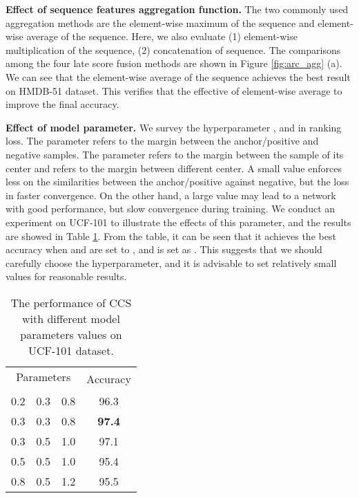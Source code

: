 \documentclass[conference,compsoc]{IEEEtran}
\begin{document}
\noindent\textbf{Effect of sequence features aggregation function.} The two commonly used aggregation methods are the element-wise maximum of the sequence and element-wise average of the sequence. Here, we also evaluate (1) element-wise multiplication of the sequence, (2) concatenation of sequence. The comparisons among the four late score fusion methods are shown in Figure \ref{fig:arc_agg} (a). We can see that the element-wise average of the sequence achieves the best result on HMDB-51 dataset. This verifies that the effective of element-wise average to improve the final accuracy.

\noindent\textbf{Effect of model parameter.} We survey the hyperparameter ,  and  in ranking loss. The parameter  refers to the margin between the anchor/positive and negative samples. The parameter  refers to the margin between the sample of its center and  refers to the margin between different center. A small value enforces less on the similarities between the anchor/positive against negative, but the loss in faster convergence. On the other hand, a large value may lead to a network with good performance, but slow convergence during training. We conduct an experiment on UCF-101 to illustrate the effects of this parameter, and the results are showed in Table \ref{tab:hyper}. From the table, it can be seen that it achieves the best accuracy when  and  are set to , and  is set as . This suggests that we should carefully choose the hyperparameter, and it is advisable to set relatively small  values for reasonable results.

\begin{table}
    \caption{The performance of CCS with different model parameters values on UCF-101 dataset.}
   \label{tab:hyper}
\vspace{-3mm}
   \begin{center}
      \begin{tabular}{cccc}
         \toprule
         \multicolumn{3}{c}{Parameters} &
         \multirow{2}{*}{Accuracy} \\
          &  &  \\
         \midrule
          0.2 & 0.3 & 0.8 & 96.3  \\
          0.3 & 0.3 & 0.8 & \textbf{97.4}  \\
          0.3 & 0.5 & 1.0 & 97.1  \\
          0.5 & 0.5 & 1.0 & 95.4  \\
          0.8 & 0.5 & 1.2 & 95.5   \\
         \bottomrule
      \end{tabular}
   \end{center}
\end{table}
\end{document}

